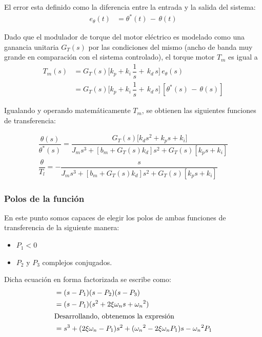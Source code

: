 \documentclass[journal]{IEEEtran}
\begin{document}
El error esta definido como la diferencia entre la entrada y la salida del sistema:
 \begin{align}
  e_\theta (t) &= \theta^* (t) \,-\, \theta (t)
 \end{align}
 
Dado que el modulador de torque del motor eléctrico es modelado como una ganancia 
unitaria $G_T(s)$ por las condiciones del mismo (ancho de banda muy grande en 
comparación con el sistema controlado), el torque motor $T_m$ es igual a
 \begin{align}
   T_m (s) &= G_T (s) \big[ k_p + k_i \, \dfrac{1}{s} + \,k_d \,s] \, e_\theta (s) \\
           &= G_T (s) \big[ k_p + k_i \, \dfrac{1}{s} + \,k_d \,s] \, [\theta^* (s) \,-\, \theta (s)]
 \end{align}

Igualando y operando matemáticamente $T_m$, se obtienen las siguientes funciones
de transferencia:

 \begin{align}
    \dfrac{\theta(s)}{\theta^*(s)} = \dfrac{G_T(s)\big[k_d s^2 + k_p s + k_i]}{J_m s^3 + [b_m + G_T(s) k_d] s^2 + G_T (s)[k_p s + k_i]}\\
    \dfrac{\theta}{T_l} = - \dfrac{s}{J_m s^3 + [b_m + G_T(s) k_d] s^2 + G_T(s)[k_p s + k_i]}
 \end{align}
 
 
\subsubsection{Polos de la función}
En este punto somos capaces de elegir los polos de ambas funciones de transferencia de la 
siguiente manera:
\begin{itemize}
 \item $P_1 < 0$ 
 \item $P_2$ y $P_3$ complejos conjugados.
\end{itemize}
Dicha ecuación en forma factorizada se escribe como:
\begin{align}
    &=(s - P_1)(s - P_2)(s - P_3)\\
    &=(s - P_1)(s^2 + 2 \xi {\omega}_n s + {{\omega}_n}^2)\\
    \intertext{Desarrollando, obtenemos la expresión} 
    &=s^3 + (2 \xi {\omega}_n - P_1) s^2 + ({{\omega}_n}^2 - 2 \xi {\omega}_n P_1) s - {{\omega}_n}^2 P_1
\end{align}
\end{document}
